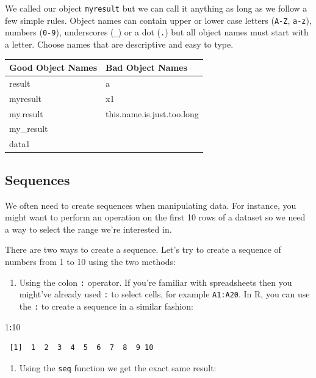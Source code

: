 \documentclass[]{book}
\newenvironment{Shaded}{\begin{snugshade}}{\end{snugshade}}
\newcommand{\DecValTok}[1]{\textcolor[rgb]{0.00,0.00,0.81}{#1}}
\newcommand{\OperatorTok}[1]{\textcolor[rgb]{0.81,0.36,0.00}{\textbf{#1}}}
\providecommand{\tightlist}{%
  \setlength{\itemsep}{0pt}\setlength{\parskip}{0pt}}
\theoremstyle{definition}
\theoremstyle{definition}
\theoremstyle{definition}
\theoremstyle{remark}
\begin{document}
We called our object \texttt{myresult} but we can call it anything as
long as we follow a few simple rules. Object names can contain upper or
lower case letters (\texttt{A-Z}, \texttt{a-z}), numbers (\texttt{0-9}),
underscores (\texttt{\_}) or a dot (\texttt{.}) but all object names
must start with a letter. Choose names that are descriptive and easy to
type.

\begin{longtable}[]{@{}ll@{}}
\toprule
Good Object Names & Bad Object Names\tabularnewline
\midrule
\endhead
result & a\tabularnewline
myresult & x1\tabularnewline
my.result & this.name.is.just.too.long\tabularnewline
my\_result &\tabularnewline
data1 &\tabularnewline
\bottomrule
\end{longtable}

\subsection{Sequences}\label{sequences}

We often need to create sequences when manipulating data. For instance,
you might want to perform an operation on the first 10 rows of a dataset
so we need a way to select the range we're interested in.

There are two ways to create a sequence. Let's try to create a sequence
of numbers from 1 to 10 using the two methods:

\begin{enumerate}
\def\labelenumi{\arabic{enumi}.}
\tightlist
\item
  Using the colon \texttt{:} operator. If you're familiar with
  spreadsheets then you might've already used \texttt{:} to select
  cells, for example \texttt{A1:A20}. In R, you can use the \texttt{:}
  to create a sequence in a similar fashion:
\end{enumerate}

\begin{Shaded}
\begin{Highlighting}[]
\DecValTok{1}\OperatorTok{:}\DecValTok{10}
\end{Highlighting}
\end{Shaded}

\begin{verbatim}
 [1]  1  2  3  4  5  6  7  8  9 10
\end{verbatim}

\begin{enumerate}
\def\labelenumi{\arabic{enumi}.}
\tightlist
\item
  Using the \texttt{seq} function we get the exact same result:
\end{enumerate}
\end{document}
